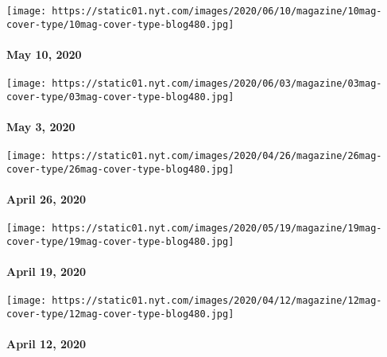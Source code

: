 \href{https://www.nytimes.com/issue/magazine/2020/05/07/the-51020-issue}{}

\texttt{[image: https://static01.nyt.com/images/2020/06/10/magazine/10mag-cover-type/10mag-cover-type-blog480.jpg]}

\hypertarget{may-10-2020}{%
\paragraph{May 10, 2020}\label{may-10-2020}}

\href{https://www.nytimes.com/issue/magazine/2020/04/30/the-5320-issue}{}

\texttt{[image: https://static01.nyt.com/images/2020/06/03/magazine/03mag-cover-type/03mag-cover-type-blog480.jpg]}

\hypertarget{may-3-2020}{%
\paragraph{May 3, 2020}\label{may-3-2020}}

\href{https://www.nytimes.com/issue/magazine/2020/04/23/the-42620-issue}{}

\texttt{[image: https://static01.nyt.com/images/2020/04/26/magazine/26mag-cover-type/26mag-cover-type-blog480.jpg]}

\hypertarget{april-26-2020}{%
\paragraph{April 26, 2020}\label{april-26-2020}}

\href{https://www.nytimes.com/issue/magazine/2020/04/17/the-41920-issue}{}

\texttt{[image: https://static01.nyt.com/images/2020/05/19/magazine/19mag-cover-type/19mag-cover-type-blog480.jpg]}

\hypertarget{april-19-2020}{%
\paragraph{April 19, 2020}\label{april-19-2020}}

\href{https://www.nytimes.com/issue/magazine/2020/04/10/the-41220-issue}{}

\texttt{[image: https://static01.nyt.com/images/2020/04/12/magazine/12mag-cover-type/12mag-cover-type-blog480.jpg]}

\hypertarget{april-12-2020}{%
\paragraph{April 12, 2020}\label{april-12-2020}}

